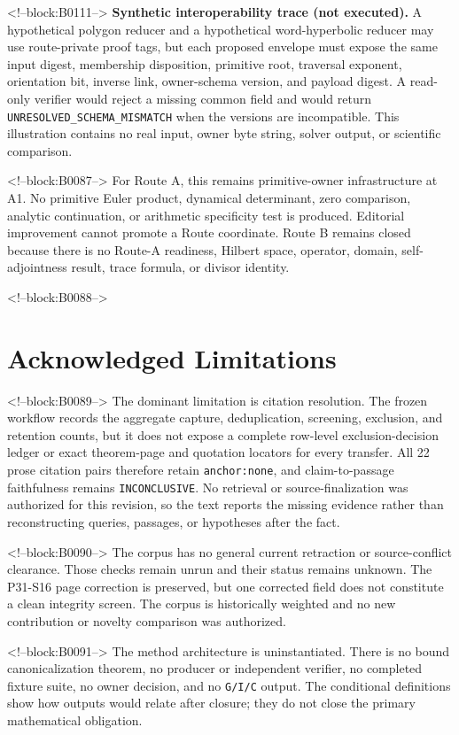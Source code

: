 \documentclass[11pt]{article}
\begin{document}
<!--block:B0111-->
\noindent\textbf{Synthetic interoperability trace (not executed).}
A hypothetical polygon reducer and a hypothetical word-hyperbolic reducer may
use route-private proof tags, but each proposed envelope must expose the same
input digest, membership disposition, primitive root, traversal exponent,
orientation bit, inverse link, owner-schema version, and payload digest. A
read-only verifier would reject a missing common field and would return
\texttt{UNRESOLVED\_SCHEMA\_MISMATCH} when the versions are incompatible.
This illustration contains no real input, owner byte string, solver output, or
scientific comparison.

<!--block:B0087-->
For Route A, this remains primitive-owner infrastructure at A1. No
primitive Euler product, dynamical determinant, zero comparison,
analytic continuation, or arithmetic specificity test is produced.
Editorial improvement cannot promote a Route coordinate. Route B remains
closed because there is no Route-A readiness, Hilbert space, operator,
domain, self-adjointness result, trace formula, or divisor identity.

<!--block:B0088-->
\hypertarget{8-acknowledged-limitations}{%
\section{Acknowledged
Limitations}\label{8-acknowledged-limitations}}

<!--block:B0089-->
The dominant limitation is citation resolution. The frozen workflow records
the aggregate capture, deduplication, screening, exclusion, and retention
counts, but it does not expose a complete row-level exclusion-decision ledger
or exact theorem-page and quotation locators for every transfer. All 22 prose
citation pairs therefore retain \texttt{anchor:none}, and claim-to-passage
faithfulness remains \texttt{INCONCLUSIVE}. No retrieval or source-finalization
was authorized for this revision, so the text reports the missing evidence
rather than reconstructing queries, passages, or hypotheses after the fact.

<!--block:B0090-->
The corpus has no general current retraction or source-conflict
clearance. Those checks remain unrun and their status remains unknown.
The P31-S16 page correction is
preserved, but one corrected field does not constitute a clean integrity
screen. The corpus is historically weighted and no new contribution or
novelty comparison was authorized.

<!--block:B0091-->
The method architecture is uninstantiated. There is no bound
canonicalization theorem, no producer or independent verifier, no
completed fixture suite, no owner decision, and no \texttt{G/I/C}
output. The conditional definitions show how outputs would relate after
closure; they do not close the primary mathematical obligation.
\end{document}
